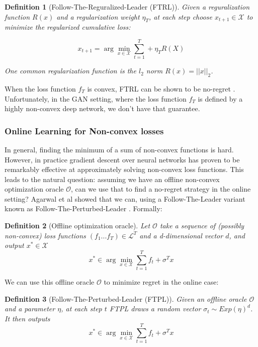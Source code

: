 \documentclass[]{article}
\newcommand{\X}{\mathcal{X}}
\newtheorem{definition}{Definition}
\begin{document}
\begin{definition}[Follow-The-Reguralized-Leader (FTRL)]
    Given a reguralization function $R(x)$ and a regularization weight $\eta_T$, at each step choose $x_{t+1} \in \X$ to minimize the regularized cumulative loss:

    \begin{equation}
        x_{t+1} = \arg\min_{x \in \X} \sum_{t=1}^T + \eta_T R(X)
    \end{equation}

    One common regularization function is the $l_2$ norm $R(x) = ||x||_2$.  
\end{definition}

When the loss function $f_T$ is convex, FTRL can be shown to be no-regret \cite{Haz19}. Unfortunately, in the GAN setting, where the loss function $f_T$ is defined by a highly non-convex deep network, we don't have that guarantee. 

\subsubsection{Online Learning for Non-convex losses}
In general, finding the minimum of a sum of non-convex functions is hard. However, in practice gradient descent over neural networks has proven to be remarkably effective at approximately solving non-convex loss functions. This leads to the natural question: assuming we have an offline non-convex optimization oracle $\mathcal{O}$, can we use that to find a no-regret strategy in the online setting? Agarwal et al showed that we can, using a Follow-The-Leader variant known as Follow-The-Perturbed-Leader \cite{AGH18}. Formally:

\begin{definition}[Offline optimization oracle]
    Let $\mathcal{O}$ take a sequence of (possibly non-convex) loss functions $(f_1...f_T) \in \mathcal{L}^T$ and a d-dimensional vector $d$, and output $x^* \in \X$
    \begin{equation}
        x^* \in \arg\min_{x \in \X} \sum_{t=1}^Tf_t + \sigma^Tx
    \end{equation}
\end{definition}

We can use this offline oracle $\mathcal{O}$ to minimize regret in the online case:

\begin{definition}[Follow-The-Perturbed-Leader (FTPL)]
    Given an offline oracle $\mathcal{O}$ and a parameter $\eta$, at each step $t$ FTPL draws a random vector $\sigma_t \sim Exp(\eta)^d$. It then outputs 
    \begin{equation}
        x^* \in \arg\min_{x \in \X} \sum_{t=1}^Tf_t + \sigma^Tx
    \end{equation}
\end{definition}
\end{document}
